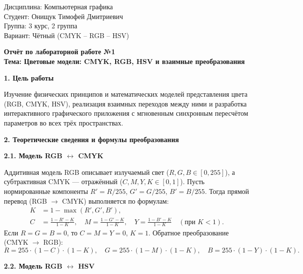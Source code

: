 \documentclass[14pt,a4paper]{extarticle}
\begin{document}
\begin{flushright}
Дисциплина: Компьютерная графика\\
Студент: Онищук Тимофей Дмитриевич\\
Группа: 3 курс, 2 группа\\
Вариант: Чётный (CMYK -- RGB -- HSV)
\end{flushright}

\vspace{1.0cm}

\begin{center}
\textbf{Отчёт по лабораторной работе №1}\\
\textbf{Тема: Цветовые модели: CMYK, RGB, HSV и взаимные преобразования}
\end{center}

\vspace{0.5cm}

\noindent\textbf{1. Цель работы}

Изучение физических принципов и математических моделей представления цвета (RGB, CMYK, HSV), реализация взаимных переходов между ними и разработка интерактивного графического приложения с мгновенным синхронным пересчётом параметров во всех трёх пространствах.

\vspace{0.5cm}
\noindent\textbf{2. Теоретические сведения и формулы преобразования}

\textbf{2.1. Модель RGB $\leftrightarrow$ CMYK}

Аддитивная модель RGB описывает излучаемый свет ($R, G, B \in [0, 255]$), а субтрактивная CMYK — отражённый ($C, M, Y, K \in [0, 1]$).
Пусть нормированные компоненты $R' = R / 255$, $G' = G / 255$, $B' = B / 255$. Тогда прямой перевод (RGB $\to$ CMYK) выполняется по формулам:
\begin{align*}
K &= 1 - \max(R', G', B'), \\
C &= \frac{1 - R' - K}{1 - K}, \quad M = \frac{1 - G' - K}{1 - K}, \quad Y = \frac{1 - B' - K}{1 - K} \quad (\text{при } K < 1).
\end{align*}
Если $R = G = B = 0$, то $C = M = Y = 0$, $K = 1$. Обратное преобразование (CMYK $\to$ RGB):
\[
R = 255 \cdot (1 - C) \cdot (1 - K), \quad G = 255 \cdot (1 - M) \cdot (1 - K), \quad B = 255 \cdot (1 - Y) \cdot (1 - K).
\]

\textbf{2.2. Модель RGB $\leftrightarrow$ HSV}
\end{document}
